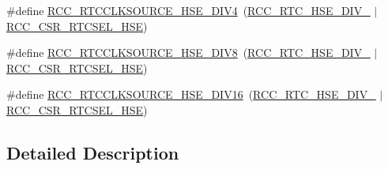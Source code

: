 \begin{DoxyCompactItemize}
\item 
\#define \hyperlink{group___r_c_c___r_t_c___l_c_d___clock___source_ga0f45ba0fe6a8f125137d3cee8b49f7cc}{R\-C\-C\-\_\-\-R\-T\-C\-C\-L\-K\-S\-O\-U\-R\-C\-E\-\_\-\-H\-S\-E\-\_\-\-D\-I\-V4}~(\hyperlink{group___r_c_c___h_a_l___e_c___r_t_c___h_s_e___d_i_v_ga76211572770fdd4d498693f977123485}{R\-C\-C\-\_\-\-R\-T\-C\-\_\-\-H\-S\-E\-\_\-\-D\-I\-V\-\_}  $\vert$ \hyperlink{group___peripheral___registers___bits___definition_ga63cfa8b19f84b2018e49afb4c69a76da}{R\-C\-C\-\_\-\-C\-S\-R\-\_\-\-R\-T\-C\-S\-E\-L\-\_\-\-H\-S\-E})
\item 
\#define \hyperlink{group___r_c_c___r_t_c___l_c_d___clock___source_gaf4f0209bbf068b427617f380e8e42490}{R\-C\-C\-\_\-\-R\-T\-C\-C\-L\-K\-S\-O\-U\-R\-C\-E\-\_\-\-H\-S\-E\-\_\-\-D\-I\-V8}~(\hyperlink{group___r_c_c___h_a_l___e_c___r_t_c___h_s_e___d_i_v_gae6c2f7167f7c487aa37fd28dd40e6228}{R\-C\-C\-\_\-\-R\-T\-C\-\_\-\-H\-S\-E\-\_\-\-D\-I\-V\-\_}  $\vert$ \hyperlink{group___peripheral___registers___bits___definition_ga63cfa8b19f84b2018e49afb4c69a76da}{R\-C\-C\-\_\-\-C\-S\-R\-\_\-\-R\-T\-C\-S\-E\-L\-\_\-\-H\-S\-E})
\item 
\#define \hyperlink{group___r_c_c___r_t_c___l_c_d___clock___source_ga48e1ffd844b9e9192c5d7dbeed20765f}{R\-C\-C\-\_\-\-R\-T\-C\-C\-L\-K\-S\-O\-U\-R\-C\-E\-\_\-\-H\-S\-E\-\_\-\-D\-I\-V16}~(\hyperlink{group___r_c_c___h_a_l___e_c___r_t_c___h_s_e___d_i_v_ga60173d5d241b3b64f747672772c6315f}{R\-C\-C\-\_\-\-R\-T\-C\-\_\-\-H\-S\-E\-\_\-\-D\-I\-V\-\_} $\vert$ \hyperlink{group___peripheral___registers___bits___definition_ga63cfa8b19f84b2018e49afb4c69a76da}{R\-C\-C\-\_\-\-C\-S\-R\-\_\-\-R\-T\-C\-S\-E\-L\-\_\-\-H\-S\-E})
\end{DoxyCompactItemize}


\subsection{Detailed Description}


